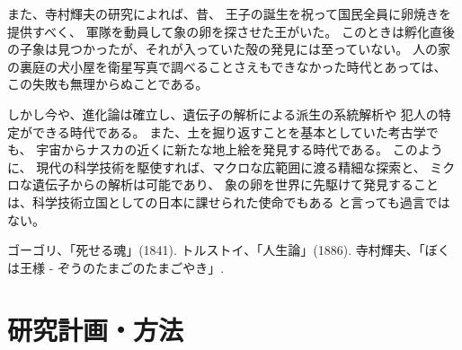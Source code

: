 \documentclass[11pt,a4paper,twoside]{jarticle}
\newcommand{\研究種別}{A}	%
\newcommand{\研究課題名}{Co-Creativeなソフトウェア開発手法向けPBL教材}
\newcommand{\研究機関名}{産業技術大学院大学}
\newcommand{\研究代表者氏名}{中鉢　欣秀}
\newcommand{\研究代表者氏名ふりがな}{ちゅうばち　よしひで}
\newcommand{\本応募effort}{\KLEffort{18}}	%
\newcommand{\研究期間の最終元号年度}{27}	%
\begin{document}
{	また、寺村輝夫の研究\cite{teramura}によれば、昔、
	王子の誕生を祝って国民全員に卵焼きを提供すべく、
	軍隊を動員して象の卵を探させた王がいた。
	このときは孵化直後の子象は見つかったが、それが入っていた殻の発見には至っていない。
	人の家の裏庭の犬小屋を衛星写真で調べることさえもできなかった時代とあっては、
	この失敗も無理からぬことである。
	
	しかし今や、進化論は確立し、遺伝子の解析による派生の系統解析や
	犯人の特定ができる時代である。
	また、土を掘り返すことを基本としていた考古学でも、
	宇宙からナスカの近くに新たな地上絵を発見する時代である。
	このように、
	現代の科学技術を駆使すれば、マクロな広範囲に渡る精細な探索と、
	ミクロな遺伝子からの解析は可能であり、
	象の卵を世界に先駆けて発見することは、科学技術立国としての日本に課せられた使命でもある
	と言っても過言ではない。
	
	\vspace{1cm}
	\begin{thebibliography}{99}
		 ゴーゴリ、「死せる魂」(1841).
		 トルストイ、「人生論」(1886).
		 寺村輝夫、「ぼくは王様 - ぞうのたまごのたまごやき」.
	\end{thebibliography}
}

\section{研究計画・方法}
\newcommand{\研究計画と方法概要}{%
	ぞうの卵を探すために、世界中を旅する。
	これも子供の頃からの夢であった。
}

\newcommand{\研究計画}{%
	初年度は、まず世界の動物園を巡り、
	研究業績 \KLcite{pub:theoegg}に可能性が示されたように
	象舍に卵が隠されていないか、探す。

	２年目はアフリカに行き、空と地上から象の卵を探す。
	アフリカ象は気性が荒いが、サバンナの方がジャングルよりも見通しが効くので、
	インドよりもアフリカを先に探索する。

	３年目は、インドとタイに行き、ジャングルに隠されている卵を探す。
	ジャングルの場合は空からは探しにくいが、象使いも多く、象の背中に乗って
	象の視点から探索することができる。
	さらに、気だての優しいインド象ならば
	卵の在処を教えてくれる可能性もある。
	
		
}
\end{document}
